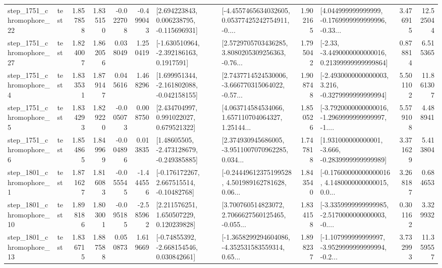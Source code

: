 \begin{tabular}{llrrrrllrlrr}
 step\_1751\_chromophore\_22 &      test &      1.857858 &    1.835150 &     -0.022708 & -0.499043 &    [2.694223843, 0.006238795, -0.115696931] &  [-4.4557465634032605, 0.05377425242754911, -0.... &       1.902165 &  [4.044999999999999, -0.1769999999999996, -0.33... &            3.476915 &         12.525044 \\
 step\_1751\_chromophore\_27 &      test &      1.824007 &    1.862056 &      0.038049 &  1.250419 &     [-1.630510964, -2.392186163, 0.1917591] &  [2.5729705703436285, 3.8080205309256363, -0.76... &       1.795042 &  [-2.33, -3.4490000000000016, 0.21399999999999864] &            0.878814 &          6.515365 \\
  step\_1751\_chromophore\_4 &      test &      1.833531 &    1.879147 &      0.045616 &  1.468296 &   [1.699951344, -2.161802088, -0.042158155] &  [2.7437714524530006, -3.666770315064022, -0.57... &       1.908748 &  [-2.4930000000000003, 3.216, -0.3279999999999994] &            5.501102 &         11.861307 \\
  step\_1751\_chromophore\_5 &      test &      1.834293 &    1.829220 &     -0.005073 &  0.008750 &     [2.434704997, 0.991022027, 0.679521322] &  [4.063714584534066, 1.657110704064327, 1.25144... &       1.850526 &  [-3.7920000000000016, -1.2969999999999997, -1.... &            5.579108 &          4.488941 \\
  step\_1751\_chromophore\_6 &      test &      1.854865 &    1.849969 &     -0.004896 &  0.013835 &    [1.48605505, -2.473128679, -0.249385885] &  [2.374930945686005, -3.9511007070962285, 0.034... &       1.747818 &   [1.931000000000001, -3.666, -0.2839999999999989] &            3.371629 &          5.413804 \\
  step\_1801\_chromophore\_1 &      test &      1.871627 &    1.816083 &     -0.055545 & -1.444556 &    [-0.176172267, 2.667515514, -0.10482768] &  [-0.24449612375199528, 4.501989162781628, 0.06... &       1.843540 &  [-0.17600000000000016, 4.1480000000000015, 0.0... &            3.268187 &          0.684653 \\
 step\_1801\_chromophore\_10 &      test &      1.898186 &    1.803001 &     -0.095185 & -2.585962 &     [2.211576251, 1.650507229, 0.120239828] &  [3.700760514823072, 2.7066627560125465, -0.055... &       1.834158 &  [-3.3359999999999985, -2.5170000000000003, -0.... &            0.301162 &          3.329932 \\
 step\_1801\_chromophore\_13 &      test &      1.836715 &    1.887588 &      0.050873 &  1.619669 &    [-0.74855392, -2.668154546, 0.030842661] &  [-1.3658299294604086, -4.352531583559314, 0.65... &       1.898237 &  [-1.107999999999997, -3.9529999999999994, -0.2... &            3.732993 &         11.359557 \\

\end{tabular}
